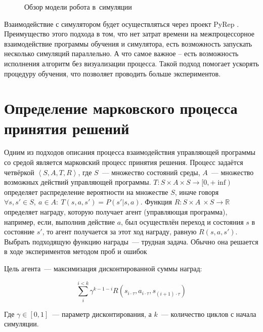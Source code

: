 \begin{figure}[ht]
    \caption[Обзор модели робота в~симуляции]{Обзор модели робота в~симуляции}\label{fig:sim_robot_2}
\end{figure}

Взаимодействие с симулятором будет осуществляться через проект PyRep \cite{james2019pyrep}. Преимущество этого подхода в том, что нет затрат времени на межпроцессорное взаимодействие программы обучения и симулятора, есть возможность запускать несколько симуляций параллельно. А что самое важное – есть возможность исполнения алгоритм без визуализации процесса. Такой подход помогает ускорять процедуру обучения, что позволяет проводить больше экспериментов.

\section{Определение марковского процесса принятия решений}\label{sec:ch1/sec3}
Одним из подходов описания процесса взаимодействия управляющей программы со средой является марковский процесс принятия решения. Процесс задаётся четвёркой $\left<S, A, T, R\right>$, где $S$~--- множество состояний среды, $A$~--- множество возможных действий управляющей программы. $T: S\times A \times S \rightarrow [0, +\inf)$ определяет распределение вероятности на множестве $S$, иначе говоря $\forall s, s' \in S,\ a\in A:\ T(s, a, s') = P(s' | s, a)$. Функция $R : S \times A \ \times S \rightarrow \mathbb{R}$ определяет награду, которую получает агент (управляющая программа), например, если, выполнив действие $a$, был осуществлён переход и состояния $s$ в состояние $s'$, то агент получается за этот ход награду, равную $R(s, a, s')$. Выбрать подходящую функцию награды~---  трудная задача. Обычно она решается в ходе экспериментов методом проб и ошибок 


Цель агента~--- максимизация дисконтированной суммы наград:

$$
\sum\limits_{i}^{i < k} \gamma ^{k - 1 - i} R(s_{i \cdot \tau}, a_{i \cdot \tau}, s_{(i+1) \cdot \tau})
$$

Где $\gamma \in [0, 1]$~--- параметр дисконтирования, а $k$~--- количество циклов с начала симуляции. 


